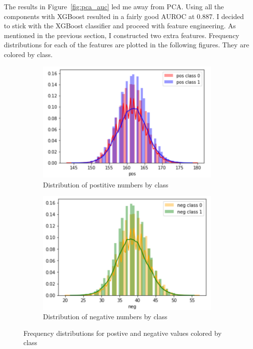 \documentclass[11pt,letterpaper]{article}
\begin{document}
The results in Figure~\ref{fig:pca_auc} led me away from PCA.  Using all the components
with XGBoost resulted in a fairly good AUROC at 0.887.  I decided to stick with the
XGBoost classifier and proceed with feature engineering.  As mentioned in the
previous section, I constructed two extra features.  Frequency distributions for
each of the features are plotted in the following figures.  They are colored by
class.

\begin{figure}[h!]
    \centering
    \begin{subfigure}[]{.4\textwidth}
        \includegraphics[width=\textwidth]{pos_dist.png}
        \caption{Distribution of postitive numbers by class}
        \label{fig:pos_dist}
    \end{subfigure}
    \begin{subfigure}[]{.4\textwidth}
        \includegraphics[width=\textwidth]{neg_dist.png}
        \caption{Distribution of negative numbers by class}
        \label{fig:neg_dist}
    \end{subfigure}
    \caption{Frequency distributions for postive and negative values colored by
class}
    \label{fig:count_dist}
\end{figure}
\end{document}
